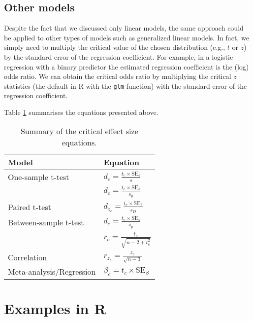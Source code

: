 \documentclass[
  man,floatsintext]{apa7}
\begin{document}
\hypertarget{other-models}{%
\subsection{Other models}\label{other-models}}

Despite the fact that we discussed only linear models, the same approach could be applied to other types of models such as generalized linear models. In fact, we simply need to multiply the critical value of the chosen distribution (e.g., \(t\) or \(z\)) by the standard error of the regression coefficient. For example, in a logistic regression with a binary predictor the estimated regression coefficient is the (log) odds ratio. We can obtain the critical odds ratio by multiplying the critical \(z\) statistics (the default in R with the \texttt{glm} function) with the standard error of the regression coefficient.

Table \ref{tab:eqsummary} summarises the equations presented above.

\footnotesize

\begin{table}[H]
\centering
\caption{\label{tab:eqsummary}Summary of the critical effect size equations.}
\centering
\begin{tabular}[t]{ll}
\toprule
\textbf{Model} & \textbf{Equation}\\
\midrule
One-sample t-test & $d_c = \frac{t_c \times \mbox{SE}_b}{s}$\\
\cmidrule{1-2}
 & $d_c = \frac{t_c \times \mbox{SE}_b}{s_p}$\\
\cmidrule{2-2}
\multirow{-2}{*}{\raggedright\arraybackslash Paired t-test} & $d_{z_c} = \frac{t_c \times \mbox{SE}_b}{s_D}$\\
\cmidrule{1-2}
Between-sample t-test & $d_c = \frac{t_c \times \mbox{SE}_b}{s_p}$\\
\cmidrule{1-2}
 & $r_c = \frac{t_c}{\sqrt{n - 2 + t^2_c}}$\\
\cmidrule{2-2}
\multirow{-2}{*}{\raggedright\arraybackslash Correlation} & $r_{z_c} = \frac{z_c}{\sqrt{n - 3}}$\\
\cmidrule{1-2}
Meta-analysis/Regression & $\beta_c = t_c \times \mbox{SE}_{\beta}$\\
\bottomrule
\end{tabular}
\end{table}

\normalsize

\hypertarget{examples-in-r}{%
\section{Examples in R}\label{examples-in-r}}
\end{document}
